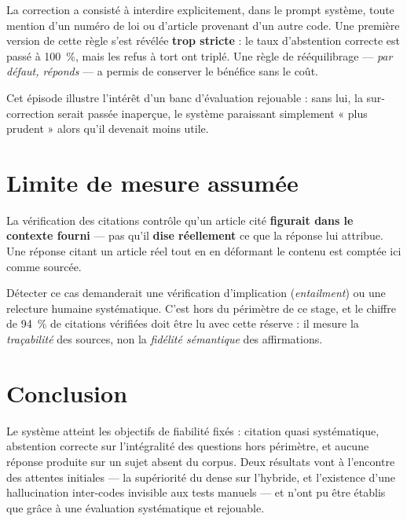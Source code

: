 La correction a consisté à interdire explicitement, dans le prompt système, toute mention d'un
numéro de loi ou d'article provenant d'un autre code. Une première version de cette règle s'est
révélée \textbf{trop stricte} : le taux d'abstention correcte est passé à 100~\%, mais les refus à
tort ont triplé. Une règle de rééquilibrage --- \emph{par défaut, réponds} --- a permis de
conserver le bénéfice sans le coût.

Cet épisode illustre l'intérêt d'un banc d'évaluation rejouable : sans lui, la sur-correction
serait passée inaperçue, le système paraissant simplement « plus prudent » alors qu'il devenait
moins utile.

\section{Limite de mesure assumée}

La vérification des citations contrôle qu'un article cité \textbf{figurait dans le contexte
fourni} --- pas qu'il \textbf{dise réellement} ce que la réponse lui attribue. Une réponse citant
un article réel tout en en déformant le contenu est comptée ici comme sourcée.

Détecter ce cas demanderait une vérification d'implication (\textit{entailment}) ou une relecture
humaine systématique. C'est hors du périmètre de ce stage, et le chiffre de 94~\% de citations
vérifiées doit être lu avec cette réserve : il mesure la \emph{traçabilité} des sources, non la
\emph{fidélité sémantique} des affirmations.

\newpage
\section*{Conclusion}

Le système atteint les objectifs de fiabilité fixés : citation quasi systématique, abstention
correcte sur l'intégralité des questions hors périmètre, et aucune réponse produite sur un sujet
absent du corpus. Deux résultats vont à l'encontre des attentes initiales --- la supériorité du
dense sur l'hybride, et l'existence d'une hallucination inter-codes invisible aux tests manuels
--- et n'ont pu être établis que grâce à une évaluation systématique et rejouable.
